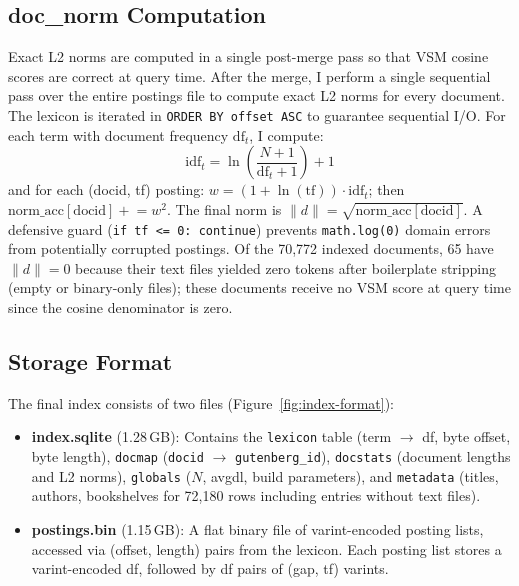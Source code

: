 \documentclass[sigconf,nonacm]{acmart}
\begin{document}
\subsection{doc\_norm Computation}\label{sec:docnorm}
Exact L2 norms are computed in a single post-merge pass so that VSM cosine
scores are correct at query time.
After the merge, I perform a single sequential pass over the entire postings
file to compute exact L2 norms for every document.  The lexicon is iterated in
\texttt{ORDER BY offset ASC} to guarantee sequential I/O.  For each term with
document frequency $\text{df}_t$, I compute:
\begin{equation}
  \text{idf}_t = \ln\!\left(\frac{N + 1}{\text{df}_t + 1}\right) + 1
\end{equation}
and for each (docid, tf) posting:
$w = (1 + \ln(\text{tf})) \cdot \text{idf}_t$; then
$\text{norm\_acc}[\text{docid}] \mathrel{+}= w^2$.
The final norm is $\|d\| = \sqrt{\text{norm\_acc}[\text{docid}]}$.  A defensive
guard (\texttt{if tf <= 0: continue}) prevents \texttt{math.log(0)}
domain errors from potentially corrupted postings.  Of the 70{,}772 indexed
documents,
65 have $\|d\| = 0$ because their text files yielded zero tokens after
boilerplate stripping (empty or binary-only files); these documents receive
no VSM score at query time since the cosine denominator is zero.

\subsection{Storage Format}



The final index consists of two files (Figure~\ref{fig:index-format}):
\begin{itemize}[nosep]
  \item \textbf{index.sqlite} (1.28\,GB): Contains the \texttt{lexicon} table
        (term $\to$ df, byte offset, byte length), \texttt{docmap}
        (\texttt{docid} $\to$ \texttt{gutenberg\_id}), \texttt{docstats} (document lengths and
        L2 norms), \texttt{globals} ($N$, avgdl, build parameters), and
        \texttt{metadata} (titles, authors, bookshelves for 72{,}180 rows
        including entries without text files).
  \item \textbf{postings.bin} (1.15\,GB): A flat binary file of varint-encoded
        posting lists, accessed via (offset, length) pairs from the lexicon.
        Each posting list stores a varint-encoded df, followed by df pairs of
        (gap, tf) varints.
\end{itemize}
\end{document}
